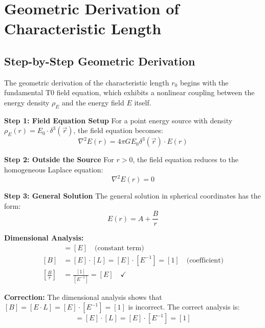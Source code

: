\documentclass[12pt,a4paper]{report}
\newcommand{\rzero}{r_0}                  %
\begin{document}
	\section{Geometric Derivation of Characteristic Length}\label{sec:geometric_derivation}
	
	\subsection{Step-by-Step Geometric Derivation}\label{subsec:geometric_derivation_steps}
	
	The geometric derivation of the characteristic length $\rzero$ begins with the fundamental T0 field equation, which exhibits a nonlinear coupling between the energy density $\rho_E$ and the energy field $E$ itself.
	
	\textbf{Step 1: Field Equation Setup}
	For a point energy source with density $\rho_E(r) = E_0 \cdot \delta^3(\vec{r})$, the field equation becomes:
	\begin{equation}
		\nabla^2 E(r) = 4\pi G E_0 \delta^3(\vec{r}) \cdot E(r)
	\end{equation}
	
	\textbf{Step 2: Outside the Source}
	For $r > 0$, the field equation reduces to the homogeneous Laplace equation:
	\begin{equation}
		\nabla^2 E(r) = 0
	\end{equation}
	
	\textbf{Step 3: General Solution}
	The general solution in spherical coordinates has the form:
	\begin{equation}
		E(r) = A + \frac{B}{r}
		\label{eq:general_solution}
	\end{equation}
	
	\textbf{Dimensional Analysis:}
	\begin{align}
		[A] &= [E] \quad \text{(constant term)} \\
		[B] &= [E] \cdot [L] = [E] \cdot [E^{-1}] = [1] \quad \text{(coefficient)} \\
		\left[\frac{B}{r}\right] &= \frac{[1]}{[E^{-1}]} = [E] \quad \checkmark
	\end{align}
	
	\textbf{Correction:} The dimensional analysis shows that $[B] = [E \cdot L] = [E] \cdot [E^{-1}] = [1]$ is incorrect. The correct analysis is:
	\begin{equation}
		[B] = [E] \cdot [L] = [E] \cdot [E^{-1}] = [1]
	\end{equation}
	
\end{document}
